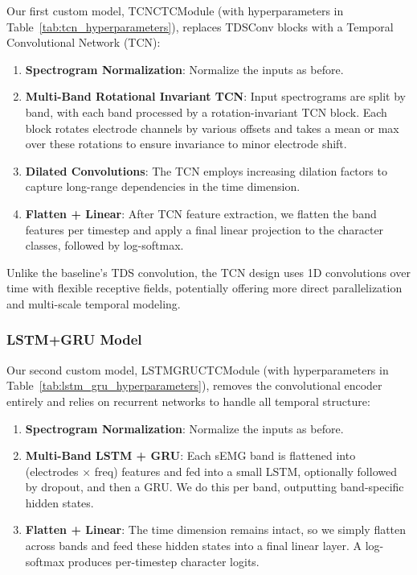 Our first custom model, TCNCTCModule (with hyperparameters in Table~\ref{tab:tcn_hyperparameters}), replaces TDSConv blocks with a Temporal Convolutional Network (TCN):

\begin{enumerate}
    \item\textbf{Spectrogram Normalization}: Normalize the inputs as before.

    \item\textbf{Multi-Band Rotational Invariant TCN}: Input spectrograms are split by band, with each band processed by a rotation-invariant TCN block. Each block rotates electrode channels by various offsets and takes a mean or max over these rotations to ensure invariance to minor electrode shift.

    \item\textbf{Dilated Convolutions}: The TCN employs increasing dilation factors to capture long-range dependencies in the time dimension.
    
    \item\textbf{Flatten + Linear}: After TCN feature extraction, we flatten the band features per timestep and apply a final linear projection to the character classes, followed by log-softmax.
\end{enumerate}

Unlike the baseline’s TDS convolution, the TCN design uses 1D convolutions over time with flexible receptive fields, potentially offering more direct parallelization and multi-scale temporal modeling.

\subsubsection{LSTM+GRU Model}

Our second custom model, LSTMGRUCTCModule (with hyperparameters in Table~\ref{tab:lstm_gru_hyperparameters}), removes the convolutional encoder entirely and relies on recurrent networks to handle all temporal structure:
\begin{enumerate}
    \item\textbf{Spectrogram Normalization}: Normalize the inputs as before.

    \item \textbf{Multi-Band LSTM + GRU}: Each sEMG band is flattened into (electrodes × freq) features and fed into a small LSTM, optionally followed by dropout, and then a GRU. We do this per band, outputting band-specific hidden states.

    \item \textbf{Flatten + Linear}: The time dimension remains intact, so we simply flatten across bands and feed these hidden states into a final linear layer. A log-softmax produces per-timestep character logits.
\end{enumerate}

